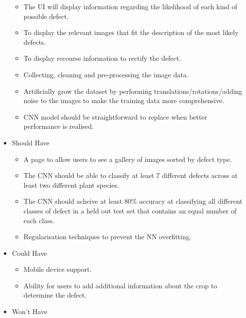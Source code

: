 \begin{itemize}
\begin{itemize}
  	\item The UI will display information regarding the likelihood of each kind of possible defect.
  	\item To display the relevant images that fit the description of the most likely defects.
  	\item To display recourse information to rectify the defect.
  	\item Collecting, cleaning and pre-processing the image data.
    \item Artificially grow the dataset by performing translations/rotations/adding noise to the images to make the training data more comprehensive.
    \item CNN model should be straightforward to replace when better performance is realised.
  \end{itemize}
  \item Should Have
  \begin{itemize}
    \item A page to allow users to see a gallery of images sorted by
      defect type.
    \item The CNN should be able to classify at least 7 different defects across at least two different plant species.
    \item The CNN should acheive at least 80\% accuracy at classifying all different classes of defect in a held out test set that contains an equal number of each class.
  	\item Regularisation techniques to prevent the NN overfitting.
  \end{itemize}
  \item Could Have
    \begin{itemize}
      \item Mobile device support.
    \end{itemize}
  \begin{itemize}
    \item Ability for users to add additional information about the crop
      to determine the defect.
  \end{itemize}
  \item Won't Have
\end{itemize}


